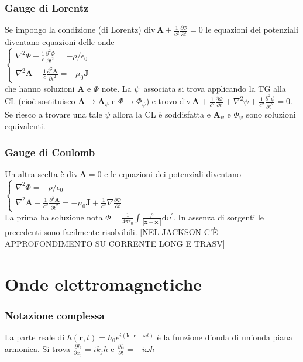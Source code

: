 \documentclass[11pt,a4paper]{article}
\newcommand{\de}{\mathrm d}
\newcommand{\fracp}[2]{\frac{\partial #1}{\partial #2}}
\newcommand{\fracpq}[2]{\frac{\partial^2\! #1}{{\partial #2}^2}}
\newcommand{\dive}[1]{\text{div}\,#1}
\begin{document}
\subsubsection{Gauge di Lorentz}
Se impongo la condizione (di Lorentz) $\dive\mathbf A + \frac1{c^2} \fracp\Phi t = 0$ le equazioni dei potenziali diventano equazioni delle onde\\
$\begin{cases}
	\nabla^2 \Phi - \frac1c \fracpq\Phi t = -\rho/\epsilon_0\\
	\nabla^2 \mathbf A - \frac1c \fracpq{\mathbf A}t = -\mu_0 \mathbf J
\end{cases}$\\
che hanno soluzioni $\mathbf A$ e $\Phi$ note. La $\psi$\ associata si trova applicando la TG alla CL (cioè sostituisco $\mathbf A \to \mathbf A_\psi$ e $\Phi \to \Phi_\psi$) e trovo $\dive\mathbf  A + \frac1{c^2} \fracp\Phi t + \nabla^2\psi + \frac1{c^2} \fracpq{\psi}t = 0$. Se riesco a trovare una tale $\psi$ allora la CL è soddisfatta e $\mathbf A_\psi$ e $\Phi_\psi$ sono soluzioni equivalenti.

\subsubsection{Gauge di Coulomb}
Un altra scelta è $\dive\mathbf A = 0$ e le equazioni dei potenziali diventano\\
$\begin{cases}
	\nabla^2 \Phi = -\rho/\epsilon_0\\
	\nabla^2 \mathbf A - \frac1{c^2} \fracpq{\mathbf A}t = -\mu_0 \mathbf J + \frac1{c^2} \nabla \fracp{\Phi} t
\end{cases}$\\
La prima ha soluzione nota $\Phi = \frac1{4\pi\epsilon_0} \int \frac\rho{|\mathbf x - \mathbf x^\prime|} \de\upsilon^\prime$. In assenza di sorgenti le precedenti sono facilmente risolvibili. [NEL JACKSON C'È APPROFONDIMENTO SU CORRENTE LONG E TRASV]

	\section{Onde elettromagnetiche}
\subsubsection{Notazione complessa}
La parte reale di $h(\mathbf r,t) = h_0 e^{i(\mathbf k \cdot \mathbf r -\omega t)}$ è la funzione d'onda di un'onda piana armonica. Si trova $\fracp{h}{x_j} = i k_j h$ e $\fracp{h}{t} = -i \omega h$
\end{document}
